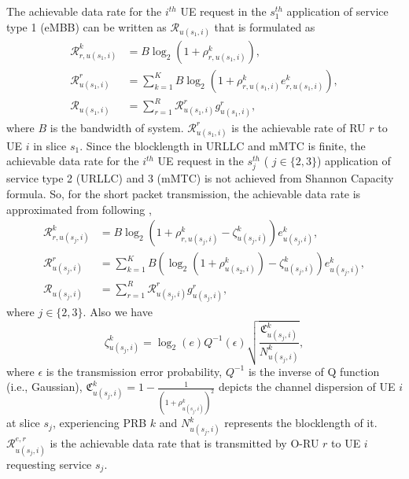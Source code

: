 \documentclass[conference]{IEEEtran}
\begin{document}
The achievable data rate for the $i^{th}$ UE request in the $s_{1}^{th}$ application of service type 1 (eMBB) can be written as $\mathcal{R}_{u(s_1,i)}$ that is formulated as
\begin{equation}\label{eq3}
\begin{split}
\mathcal{{R}}_{r,u(s_1,i)}^{k} &=  B \log_2({1+ \rho_{r,u(s_1,i)}^{k}}) ,\\
\mathcal{R}_{u(s_1,i)}^{r} &= \sum_{k=1}^{K} B \log_2({1+ \rho_{r,u(s_1,i)}^{k}} e^k_{r,u(s_1,i)}),\\
\mathcal{R}_{u(s_1,i)} &= \sum_{r=1}^{R}\mathcal{R}_{u(s_1,i)}^{r} g^r_{u(s_1,i)},
\end{split}
\end{equation}
where $B$ is the bandwidth of system. 
$\mathcal{R}_{u(s_1,i)}^{r}$ is the achievable rate of RU $r$ to UE $i$ in slice $s_1$.
Since the blocklength in URLLC and mMTC is finite, the achievable data rate for the $i^{th}$ UE request in the $s_{j}^{th}$ ( $j \in \{2,3\}$) application of service type 2 (URLLC) and 3 (mMTC) is not achieved from Shannon Capacity formula. So, for the short packet transmission, the achievable data rate is approximated from following \cite{setayesh2020joint},
\begin{equation}\label{eq11}
\begin{split}
\mathcal{{R}}_{r,u(s_j,i)}^{k} &= B \log_2({1+ \rho_{r,u(s_j,i)}^{k}} - \zeta_{u(s_j,i)}^{k}){e}_{u(s_j,i)}^{k},\\
\mathcal{R}_{u(s_j,i)}^{r} &= \sum_{k=1}^{K} B (\log_2({1+ \rho_{u(s_2,i)}^{k}})- \zeta_{u(s_j,i)}^{k}){e}_{u(s_j,i)}^{k},\\
\mathcal{R}_{u(s_j,i)} &= \sum_{r=1}^{R}\mathcal{R}_{u(s_j,i)}^{r} g^r_{u(s_j,i)},
\end{split}
\end{equation}
where $j \in \{2,3\}$. Also we have %
\begin{equation}\label{shortPacket}
 \zeta_{u(s_j,i)}^{k} = \log_2({e})Q^{-1}(\epsilon) \sqrt{\frac{\mathfrak{C}_{u(s_j,i)}^{k}}{N_{u(s_j,i)}^{k}}},
\end{equation}
where $\epsilon$ is the transmission error probability, $Q^{-1}$ is the inverse of Q function (i.e., Gaussian),
$\mathfrak{C}_{u(s_j,i)}^{k} = 1 - \frac{1}{(1+\rho_{u(s_j,i)}^{k})^2}$ depicts the channel dispersion of UE  $i$ at slice $s_j$, experiencing PRB $k$ and
$N_{u(s_j,i)}^{k}$ represents the blocklength of it. 
$\mathcal{R}_{u(s_j,i)}^{e,r}$ is the achievable data rate that is transmitted by O-RU $r$ to UE $i$ requesting service $s_j$.
\end{document}
